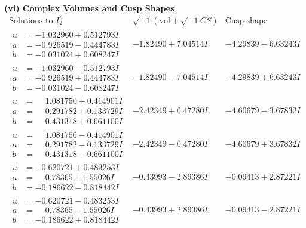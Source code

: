 \documentclass[1p]{elsarticle_modified}
\theoremstyle{definition}
\newcommand{\I}{\sqrt{-1}}
\begin{document}
\newpage\flushleft \textbf{(vi) Complex Volumes and Cusp Shapes}
$$\begin{array}{c|c|c}  
\text{Solutions to }I^u_{2}& \I (\text{vol} + \sqrt{-1}CS) & \text{Cusp shape}\\
 \hline 
\begin{aligned}
u &= -1.032960 + 0.512793 I \\
a &= -0.926519 - 0.444783 I \\
b &= -0.031024 + 0.608247 I\end{aligned}
 & -1.82490 + 7.04514 I & -4.29839 - 6.63243 I \\ \hline\begin{aligned}
u &= -1.032960 - 0.512793 I \\
a &= -0.926519 + 0.444783 I \\
b &= -0.031024 - 0.608247 I\end{aligned}
 & -1.82490 - 7.04514 I & -4.29839 + 6.63243 I \\ \hline\begin{aligned}
u &= \phantom{-}1.081750 + 0.414901 I \\
a &= \phantom{-}0.291782 + 0.133729 I \\
b &= \phantom{-}0.431318 + 0.661100 I\end{aligned}
 & -2.42349 + 0.47280 I & -4.60679 - 3.67832 I \\ \hline\begin{aligned}
u &= \phantom{-}1.081750 - 0.414901 I \\
a &= \phantom{-}0.291782 - 0.133729 I \\
b &= \phantom{-}0.431318 - 0.661100 I\end{aligned}
 & -2.42349 - 0.47280 I & -4.60679 + 3.67832 I \\ \hline\begin{aligned}
u &= -0.620721 + 0.483253 I \\
a &= \phantom{-}0.78365 + 1.55026 I \\
b &= -0.186622 - 0.818442 I\end{aligned}
 & -0.43993 - 2.89386 I & -0.09413 + 2.87221 I \\ \hline\begin{aligned}
u &= -0.620721 - 0.483253 I \\
a &= \phantom{-}0.78365 - 1.55026 I \\
b &= -0.186622 + 0.818442 I\end{aligned}
 & -0.43993 + 2.89386 I & -0.09413 - 2.87221 I \\ \hline\begin{aligned}

\end{aligned}
\end{array}$$
\end{document}
